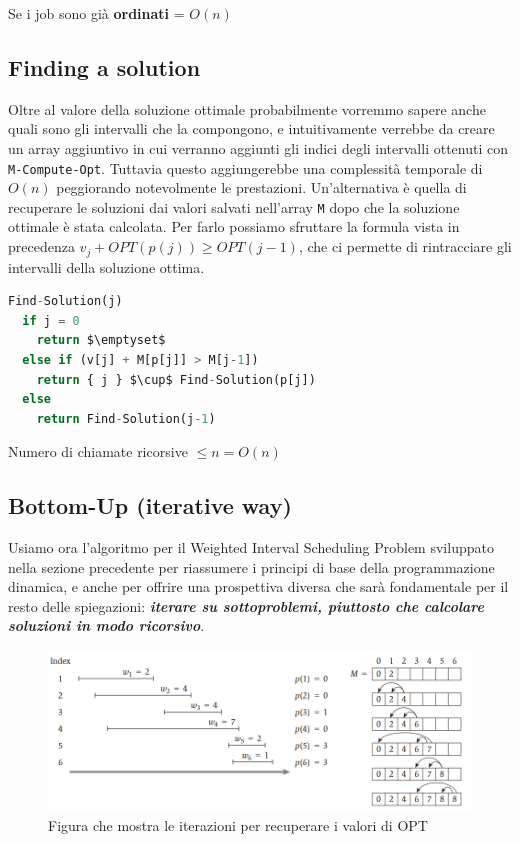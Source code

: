 Se i job sono già \textbf{ordinati} = $O(n)$


\subsection{Finding a solution}

Oltre al valore della soluzione ottimale probabilmente vorremmo sapere
anche quali sono gli intervalli che la compongono, e intuitivamente
verrebbe da creare un array aggiuntivo in cui verranno aggiunti gli
indici degli intervalli ottenuti con \texttt{M-Compute-Opt}. Tuttavia
questo aggiungerebbe una complessità temporale di $O(n)$ peggiorando
notevolmente le prestazioni. Un'alternativa è quella di recuperare le
soluzioni dai valori salvati nell'array \texttt{M} dopo che la soluzione
ottimale è stata calcolata. Per farlo possiamo sfruttare la formula
vista in precedenza $v_j + OPT(p(j)) \geq OPT(j-1)$, che ci permette
di rintracciare gli intervalli della soluzione ottima.

\begin{lstlisting}[language=Python, mathescape=true]
  Find-Solution(j)
  if j = 0
  	return $\emptyset$
  else if (v[j] + M[p[j]] > M[j-1])
  	return { j } $\cup$ Find-Solution(p[j]) 
  else
  	return Find-Solution(j-1)
\end{lstlisting}

Numero di chiamate ricorsive $\leq n = O(n)$

\subsection{Bottom-Up (iterative way)}

Usiamo ora l'algoritmo per il Weighted Interval Scheduling Problem
sviluppato nella sezione precedente per riassumere i principi di base
della programmazione dinamica, e anche per offrire una prospettiva
diversa che sarà fondamentale per il resto delle spiegazioni:
\textbf{\emph{iterare su sottoproblemi, piuttosto che calcolare
    soluzioni in modo ricorsivo}}.

\begin{figure}[H]
  \includegraphics[width = \textwidth]{Programmazione_dinamica/imgs/iter_comp_opt.png}
  \caption{Figura che mostra le iterazioni per recuperare i valori di OPT}
\end{figure}


